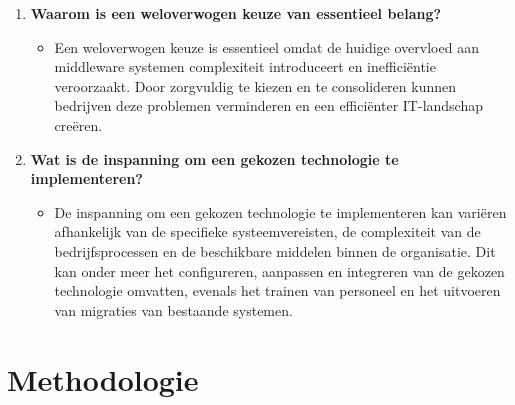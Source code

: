 \begin{enumerate}

\item \textbf{Waarom is een weloverwogen keuze van essentieel belang?}
  \begin{itemize}
      \item Een weloverwogen keuze is essentieel omdat de huidige overvloed aan middleware systemen complexiteit introduceert en 
      inefficiëntie veroorzaakt. Door zorgvuldig te kiezen en te consolideren kunnen bedrijven deze problemen verminderen en een 
      efficiënter IT-landschap creëren.
  \end{itemize}

\item \textbf{Wat is de inspanning om een gekozen technologie te implementeren?}
  \begin{itemize}
      \item De inspanning om een gekozen technologie te implementeren kan variëren afhankelijk van de specifieke systeemvereisten, 
      de complexiteit van de bedrijfsprocessen en de beschikbare middelen binnen de organisatie. Dit kan onder meer het configureren, 
      aanpassen en integreren van de gekozen technologie omvatten, evenals het trainen van personeel en het uitvoeren van migraties van 
      bestaande systemen.
  \end{itemize}
\end{enumerate}

\newpage

\section{Methodologie}%
\label{sec:methodologie}




